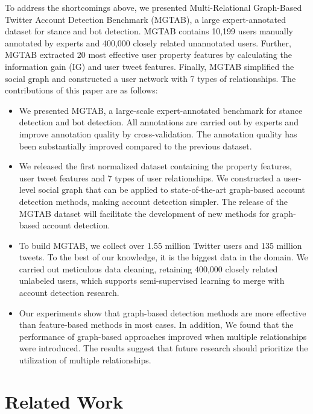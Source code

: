 \documentclass[10pt,twocolumn,letterpaper]{article}
\begin{document}
To address the shortcomings above, we presented Multi-Relational Graph-Based Twitter Account Detection Benchmark (MGTAB), a large expert-annotated dataset for stance and bot detection. MGTAB contains 10,199 users manually annotated by experts and 400,000 closely related unannotated users. Further, MGTAB extracted 20 most effective user property features by calculating the information gain (IG) and user tweet features. Finally, MGTAB simplified the social graph and constructed a user network with 7 types of relationships. The contributions of this paper are as follows:
\begin{itemize}
\item We presented MGTAB, a large-scale expert-annotated benchmark for stance detection and bot detection. All annotations are carried out by experts and improve annotation quality by cross-validation. The annotation quality has been substantially improved compared to the previous dataset.
\vspace{-0.2cm}
\item We released the first normalized dataset containing the property features, user tweet features and 7 types of user relationships. We constructed a user-level social graph that can be applied to state-of-the-art graph-based account detection methods, making account detection simpler. The release of the MGTAB dataset will facilitate the development of new methods for graph-based account detection.
\vspace{-0.2cm}
\item To build MGTAB, we collect over 1.55 million Twitter users and 135 million tweets. To the best of our knowledge, it is the biggest data in the domain. We carried out meticulous data cleaning, retaining 400,000 closely related unlabeled users, which supports semi-supervised learning to merge with account detection research.
\vspace{-0.2cm}
\item Our experiments show that graph-based detection methods are more effective than feature-based methods in most cases. In addition, We found that the performance of graph-based approaches improved when multiple relationships were introduced. The results suggest that future research should prioritize the utilization of multiple relationships.
\end{itemize}

\section{Related Work}
\label{sec:rela}
\end{document}
